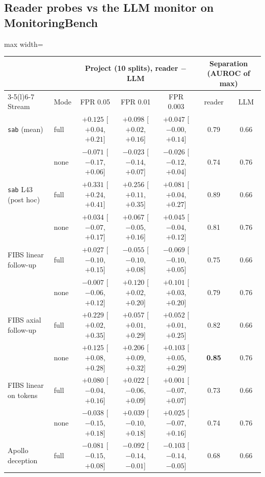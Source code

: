 \documentclass[11pt]{article}
\begin{document}
\subsection{Reader probes vs the LLM monitor on MonitoringBench}

\begin{table}[!htbp]\centering\small
\begin{adjustbox}{max width=\linewidth}\begin{tabular}{@{}llccccc@{}}
\toprule
& & \multicolumn{3}{c}{Project (10 splits), reader $-$ LLM} & \multicolumn{2}{c}{Separation (AUROC of max)}\\
\cmidrule(lr){3-5}\cmidrule(l){6-7}
Stream & Mode & FPR 0.05 & FPR 0.01 & FPR 0.003 & reader & LLM\\
\midrule
\texttt{sab} (mean) & full & $+0.125$ [$+0.04$, $+0.21$] & $+0.098$ [$+0.02$, $+0.16$] & $+0.047$ [$-0.00$, $+0.14$] & 0.79 & 0.66\\
 & none & $-0.071$ [$-0.17$, $+0.06$] & $-0.023$ [$-0.14$, $+0.07$] & $-0.026$ [$-0.12$, $+0.04$] & 0.74 & 0.76\\
\texttt{sab} L43 (post hoc) & full & $+0.331$ [$+0.24$, $+0.41$] & $+0.256$ [$+0.11$, $+0.35$] & $+0.081$ [$+0.04$, $+0.27$] & 0.89 & 0.66\\
 & none & $+0.034$ [$-0.07$, $+0.17$] & $+0.067$ [$-0.05$, $+0.16$] & $+0.045$ [$-0.04$, $+0.12$] & 0.81 & 0.76\\
FIBS linear follow-up & full & $+0.027$ [$-0.10$, $+0.15$] & $-0.055$ [$-0.10$, $+0.08$] & $-0.069$ [$-0.10$, $+0.05$] & 0.75 & 0.66\\
 & none & $-0.007$ [$-0.06$, $+0.12$] & $+0.120$ [$+0.02$, $+0.20$] & $+0.101$ [$+0.03$, $+0.20$] & 0.79 & 0.76\\
FIBS axial follow-up & full & $+0.229$ [$+0.02$, $+0.35$] & $+0.057$ [$+0.01$, $+0.29$] & $+0.052$ [$+0.01$, $+0.25$] & 0.82 & 0.66\\
 & none & $+0.125$ [$+0.08$, $+0.28$] & $\mathbf{+0.206}$ [$+0.09$, $+0.32$] & $+0.103$ [$+0.05$, $+0.29$] & \textbf{0.85} & 0.76\\
FIBS linear on tokens & full & $+0.080$ [$-0.04$, $+0.16$] & $+0.022$ [$-0.06$, $+0.09$] & $+0.001$ [$-0.07$, $+0.07$] & 0.73 & 0.66\\
 & none & $-0.038$ [$-0.15$, $+0.18$] & $+0.039$ [$-0.10$, $+0.18$] & $+0.025$ [$-0.07$, $+0.16$] & 0.74 & 0.76\\
Apollo deception & full & $-0.081$ [$-0.15$, $+0.08$] & $-0.092$ [$-0.14$, $-0.01$] & $-0.103$ [$-0.14$, $-0.05$] & 0.68 & 0.66\\

\end{tabular}
\end{adjustbox}
\end{table}
\end{document}
